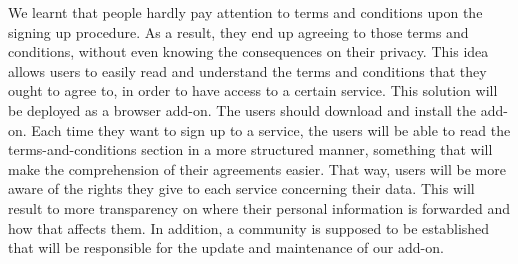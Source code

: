 We learnt that people hardly pay attention to terms and conditions upon the 
signing up procedure. As a result, they end up agreeing to those terms and 
conditions, without even knowing the consequences on their privacy. 
This idea allows users to easily read and understand the terms and conditions 
that they ought to agree to, in order to have access to a certain service.  
This solution will be deployed as a browser add-on. The users should download 
and install the add-on. Each time they want to sign up to a service, the users 
will be able to read the terms-and-conditions section in a more structured 
manner, something that will make the comprehension of their agreements easier. 
That way, users will be more aware of the rights they give to each service 
concerning their data. This will result to more transparency on where their 
personal information is forwarded and how that affects them. In addition, a 
community is supposed to be established that will be responsible for the update 
and maintenance of our add-on.  
